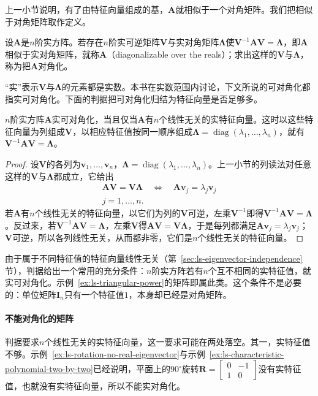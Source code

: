 上一小节说明，有了由特征向量组成的基，$\bm A$就相似于一个对角矩阵。我们把相似于对角矩阵取作定义。
\begin{definition}[实可对角化]
\label{def:ls-real-diagonalizable}
设$\bm A$是$n$阶实方阵。若存在$n$阶实可逆矩阵$\bm V$与实对角矩阵$\bm\Lambda$使$\bm V^{-1}\bm A\bm V=\bm\Lambda$，即$\bm A$相似于实对角矩阵，就称$\bm A$（diagonalizable over the reals）；求出这样的$\bm V$与$\bm\Lambda$，称为把$\bm A$对角化。
\end{definition}
“实”表示$\bm V$与$\bm\Lambda$的元素都是实数。本书在实数范围内讨论，下文所说的可对角化都指实可对角化。下面的判据把可对角化归结为特征向量是否足够多。
\begin{theorem}[对角化判据]
\label{thm:ls-diagonalization-criterion}
$n$阶实方阵$\bm A$实可对角化，当且仅当$\bm A$有$n$个线性无关的实特征向量。这时以这些特征向量为列组成$\bm V$，以相应特征值按同一顺序组成$\bm\Lambda=\operatorname{diag}(\lambda_1,\ldots,\lambda_n)$，就有$\bm V^{-1}\bm A\bm V=\bm\Lambda$。
\end{theorem}
\begin{proof}
设$\bm V$的各列为$\bm v_1,\ldots,\bm v_n$，$\bm\Lambda=\operatorname{diag}(\lambda_1,\ldots,\lambda_n)$。上一小节的列读法对任意这样的$\bm V$与$\bm\Lambda$都成立，它给出
\[
 \begin{gathered}
\bm A\bm V=\bm V\bm\Lambda
 \quad\Longleftrightarrow\quad
 \bm A\bm v_j=\lambda_j\bm v_j\\
j=1,\ldots,n.
 \end{gathered}
\]
若$\bm A$有$n$个线性无关的特征向量，以它们为列的$\bm V$可逆，左乘$\bm V^{-1}$即得$\bm V^{-1}\bm A\bm V=\bm\Lambda$。反过来，若$\bm V^{-1}\bm A\bm V=\bm\Lambda$，左乘$\bm V$得$\bm A\bm V=\bm V\bm\Lambda$，于是每列都满足$\bm A\bm v_j=\lambda_j\bm v_j$；$\bm V$可逆，所以各列线性无关，从而都非零，它们是$n$个线性无关的特征向量。
\end{proof}
由于属于不同特征值的特征向量线性无关（第~\ref{sec:ls-eigenvector-independence}节），判据给出一个常用的充分条件：$n$阶实方阵若有$n$个互不相同的实特征值，就实可对角化。示例~\ref{ex:ls-triangular-power}的矩阵即属此类。这个条件不是必要的：单位矩阵$\bm I_n$只有一个特征值$1$，本身却已经是对角矩阵。

\paragraph{不能对角化的矩阵}
判据要求$n$个线性无关的实特征向量，这一要求可能在两处落空。其一，实特征值不够。示例~\ref{ex:ls-rotation-no-real-eigenvector}与示例~\ref{ex:ls-characteristic-polynomial-two-by-two}已经说明，平面上的$90^\circ$旋转$\bm R=\left[\begin{smallmatrix}0&-1\\1&0\end{smallmatrix}\right]$没有实特征值，也就没有实特征向量，所以不能实对角化。

